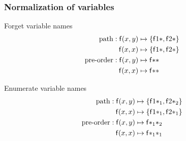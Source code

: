 
\begin{frame}
	\frametitle{Normalization of variables}
	
	\begin{exampleblock}{Forget variable names}
		\vspace{-1em}
	\begin{align*}
		\text{path}: {\mathsf f}(x,y)  &\mapsto \{ {\mathsf f} 1 {*}, {\mathsf f} 2 {*} \}\\
			{\mathsf f}(x,x)  &\mapsto \{ {\mathsf f} 1 {*}, {\mathsf f} 2 {*} \}\\
		\text{pre-order}:
		{\mathsf f}(x,y) &\mapsto {\mathsf f} {*} {*} \\
		{\mathsf f}(x,x) &\mapsto {\mathsf f} {*} {*}
			\end{align*}
			\end{exampleblock}
%	

\begin{exampleblock}{Enumerate variable names}
	\vspace{-1em}	
	\begin{align*}
		\text{path}: {\mathsf f}(x,y)  &\mapsto \{ {\mathsf f} 1 {*_1}, {\mathsf f} 2 {*_2} \}\\
		{\mathsf f}(x,x)  &\mapsto \{ {\mathsf f} 1 {*_1}, {\mathsf f} 2 {*_1} \}\\
		\text{pre-order}:
		{\mathsf f}(x,y) &\mapsto {\mathsf f} {*_1} {*_2} \\
		{\mathsf f}(x,x) &\mapsto {\mathsf f} {*_1} {*_1}
	\end{align*}
	\end{exampleblock}
	\end{frame}